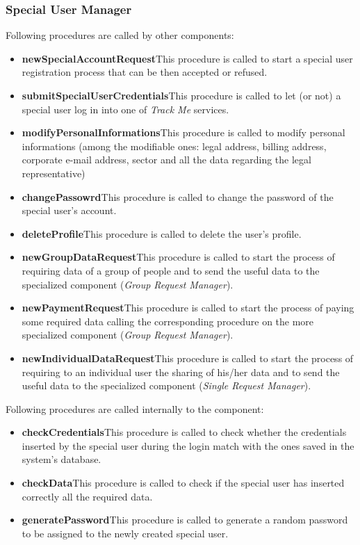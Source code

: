 \subsubsection{Special User Manager}
Following procedures are called by other components:
\begin{itemize}
  \item \textbf{newSpecialAccountRequest}\quad This procedure is called to start a special user registration process that can be then accepted or refused.
  \item \textbf{submitSpecialUserCredentials}\quad This procedure is called to let (or not) a special user log in into one of \textit{Track Me} services.
  \item \textbf{modifyPersonalInformations}\quad This procedure is called to modify personal informations (among the modifiable ones:  legal address, billing address, corporate e-mail address, sector and all the data regarding the legal representative)
  \item \textbf{changePassowrd}\quad This procedure is called to change the password of the special user's account.
  \item \textbf{deleteProfile}\quad This procedure is called to delete the user's profile.
  \item \textbf{newGroupDataRequest}\quad This procedure is called to start the process of requiring data of a group of people and to send the useful data to the specialized component (\textit{Group Request Manager}).
  \item \textbf{newPaymentRequest}\quad This procedure is called to start the process of paying some required data calling the corresponding procedure on the more specialized component (\textit{Group Request Manager}).
  \item \textbf{newIndividualDataRequest}\quad This procedure is called to start the process of requiring to an individual user the sharing of his/her data and to send the useful data to the specialized component (\textit{Single Request Manager}).
\end{itemize}

\myparagraph{}
Following procedures are called internally to the component:
\begin{itemize}
  \item \textbf{checkCredentials}\quad This procedure is called to check whether the credentials inserted by the special user during the login match with the ones saved in the system's database.
  \item \textbf{checkData}\quad This procedure is called to check if the special user has inserted correctly all the required data.
  \item \textbf{generatePassword}\quad This procedure is called to generate a random password to be assigned to the newly created special user.
\end{itemize}

